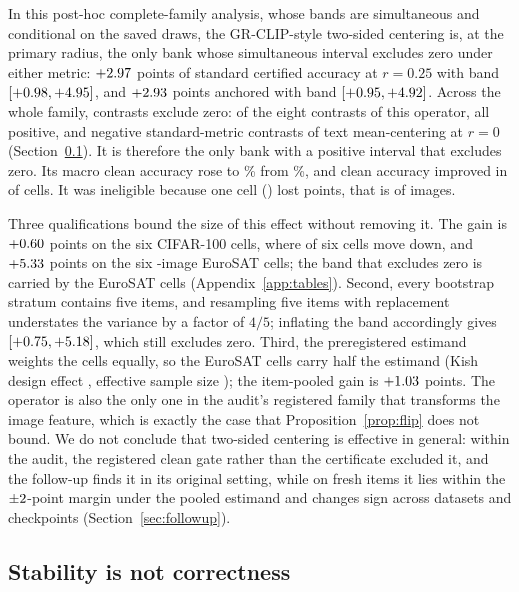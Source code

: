 In this post-hoc complete-family analysis, whose bands are simultaneous and
conditional on the saved draws, the GR-CLIP-style two-sided centering is, at the
primary radius, the only bank whose simultaneous interval excludes zero under
either metric: $+2.97$ points of standard certified accuracy at
$r=0.25$ with band $[+0.98,+4.95]$, and $+2.93$ points
anchored with band $[+0.95,+4.92]$. Across the whole family,
\BandExclZero{} contrasts exclude zero: \BandExclZeroGR{} of the eight
contrasts of this operator, all positive, and \BandExclZeroOther{} negative
standard-metric contrasts of text mean-centering at $r=0$
(Section~\ref{sec:semantics}). It is therefore the only bank with a positive
interval that excludes zero. Its macro clean accuracy rose to \GRClean\% from \NoCorrClean\%, and
clean accuracy improved in \GRCellsImproved{} of \ExpCells{} cells. It was
ineligible because one cell (\GRWorstCell) lost \GRWorstCellDrop{} points, that
is \GRWorstCellImages{} of \ExpEurosatItemsPerCell{} images.

Three qualifications bound the size of this effect without removing it. The
gain is $+0.60$ points on the six CIFAR-100 cells, where
\GRStdCifarCellsNegative{} of six cells move down, and $+5.33$
points on the six \ExpEurosatItemsPerCell-image EuroSAT cells; the band that
excludes zero is carried by the EuroSAT cells (Appendix~\ref{app:tables}).
Second, every bootstrap stratum contains five items, and resampling five items
with replacement understates the variance by a factor of $4/5$; inflating the
band accordingly gives $[+0.75,+5.18]$, which still
excludes zero. Third, the preregistered estimand weights the \ExpCells{} cells
equally, so the EuroSAT cells carry half the estimand (Kish design effect
\KishDesignEffect{}, effective sample size \EffectiveN{}); the item-pooled gain
is $+1.03$ points. The operator is also the only one in the audit's registered family that
transforms the image feature, which is exactly the case that
Proposition~\ref{prop:flip} does not bound. We do not conclude that two-sided
centering is effective in general: within the audit, the registered clean gate
rather than the certificate excluded it, and the follow-up finds it in its
original setting, while on fresh items it lies within the $\pm2$-point
margin under the pooled estimand and changes sign across datasets and
checkpoints (Section~\ref{sec:followup}).

\subsection{Stability is not correctness}
\label{sec:semantics}

